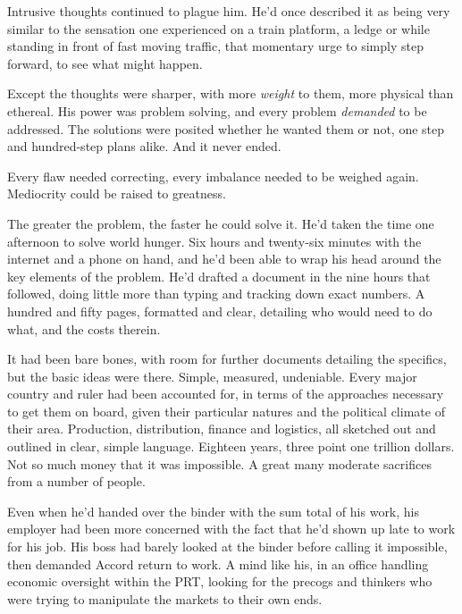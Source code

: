 Intrusive thoughts continued to plague him.  He'd once described it as being very similar to the sensation one experienced on a train platform, a ledge or while standing in front of fast moving traffic, that momentary urge to simply step forward, to see what might happen.



Except the thoughts were sharper, with more \emph{weight} to them, more physical than ethereal.  His power was problem solving, and every problem \emph{demanded} to be addressed. The solutions were posited whether he wanted them or not, one step and hundred-step plans alike.  And it never ended.



Every flaw needed correcting, every imbalance needed to be weighed again.  Mediocrity could be raised to greatness.



The greater the problem, the faster he could solve it.  He'd taken the time one afternoon to solve world hunger.  Six hours and twenty-six minutes with the internet and a phone on hand, and he'd been able to wrap his head around the key elements of the problem.  He'd drafted a document in the nine hours that followed, doing little more than typing and tracking down exact numbers.  A hundred and fifty pages, formatted and clear, detailing who would need to do what, and the costs therein.



It had been bare bones, with room for further documents detailing the specifics, but the basic ideas were there.  Simple, measured, undeniable.  Every major country and ruler had been accounted for, in terms of the approaches necessary to get them on board, given their particular natures and the political climate of their area.  Production, distribution, finance and logistics, all sketched out and outlined in clear, simple language.  Eighteen years, three point one trillion dollars.  Not so much money that it was impossible.  A great many moderate sacrifices from a number of people.



Even when he'd handed over the binder with the sum total of his work, his employer had been more concerned with the fact that he'd shown up late to work for his job.  His boss had barely looked at the binder before calling it impossible, then demanded Accord return to work.  A mind like his, in an office handling economic oversight within the PRT, looking for the precogs and thinkers who were trying to manipulate the markets to their own ends.



